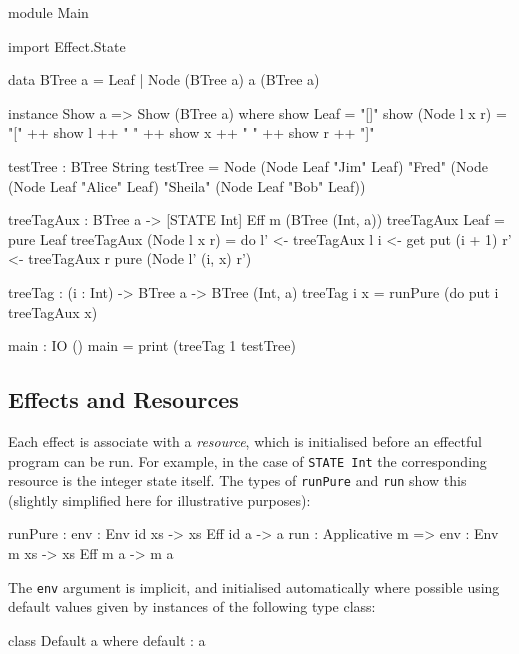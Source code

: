 \begin{code}[float=h,frame=single,caption={Tree tagging}, label=introprog]
module Main

import Effect.State

data BTree a = Leaf
             | Node (BTree a) a (BTree a)

instance Show a => Show (BTree a) where
    show Leaf = "[]"
    show (Node l x r) = "[" ++ show l ++ " "
                            ++ show x ++ " "
                            ++ show r ++ "]"

testTree : BTree String
testTree = Node (Node Leaf "Jim" Leaf)
              "Fred"
              (Node (Node Leaf "Alice" Leaf)
                    "Sheila"
                    (Node Leaf "Bob" Leaf))

treeTagAux : BTree a -> { [STATE Int] } Eff m (BTree (Int, a))
treeTagAux Leaf = pure Leaf
treeTagAux (Node l x r)
  = do l' <- treeTagAux l
       i <- get
       put (i + 1)
       r' <- treeTagAux r
       pure (Node l' (i, x) r')

treeTag : (i : Int) -> BTree a -> BTree (Int, a)
treeTag i x = runPure (do put i
                          treeTagAux x)

main : IO () 
main = print (treeTag 1 testTree) 
\end{code}


\subsection{Effects and Resources}

Each effect is associate with a \emph{resource}, which is initialised before
an effectful program can be run. For example, in the case of \texttt{STATE Int}
the corresponding resource is the integer state itself.
The types of \texttt{runPure} and \texttt{run} show this (slightly
simplified here for illustrative purposes):

\begin{code}
runPure : {env : Env id xs} -> { xs } Eff id a -> a
run : Applicative m => {env : Env m xs} -> { xs } Eff m a -> m a
\end{code}

\noindent
The \texttt{env} argument is implicit, and initialised automatically where
possible using default values given by instances of the following type class:

\begin{code}
class Default a where
    default : a
\end{code}

